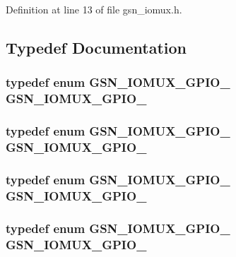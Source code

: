 Definition at line 13 of file gsn\_\-iomux.h.



\subsection{Typedef Documentation}
\hypertarget{a00519_ade0273b085246199565e368850baa6c2}{
\subsubsection[{GSN\_\-IOMUX\_\-GPIO\_\-0}]{\setlength{\rightskip}{0pt plus 5cm}typedef enum {\bf GSN\_\-IOMUX\_\-GPIO\_} {\bf GSN\_\-IOMUX\_\-GPIO\_}}}
\label{a00519_ade0273b085246199565e368850baa6c2}
\hypertarget{a00519_ab58ab2c9132006fae55408efa7d62eec}{
\subsubsection[{GSN\_\-IOMUX\_\-GPIO\_\-1}]{\setlength{\rightskip}{0pt plus 5cm}typedef enum {\bf GSN\_\-IOMUX\_\-GPIO\_} {\bf GSN\_\-IOMUX\_\-GPIO\_}}}
\label{a00519_ab58ab2c9132006fae55408efa7d62eec}
\hypertarget{a00519_aa3557aceca1d57020b7bcfe6cfd9ed8e}{
\subsubsection[{GSN\_\-IOMUX\_\-GPIO\_\-10}]{\setlength{\rightskip}{0pt plus 5cm}typedef enum {\bf GSN\_\-IOMUX\_\-GPIO\_} {\bf GSN\_\-IOMUX\_\-GPIO\_}}}
\label{a00519_aa3557aceca1d57020b7bcfe6cfd9ed8e}
\hypertarget{a00519_a47791ebdd0d63309e31435ca7455ecc5}{
\subsubsection[{GSN\_\-IOMUX\_\-GPIO\_\-11}]{\setlength{\rightskip}{0pt plus 5cm}typedef enum {\bf GSN\_\-IOMUX\_\-GPIO\_} {\bf GSN\_\-IOMUX\_\-GPIO\_}}}
